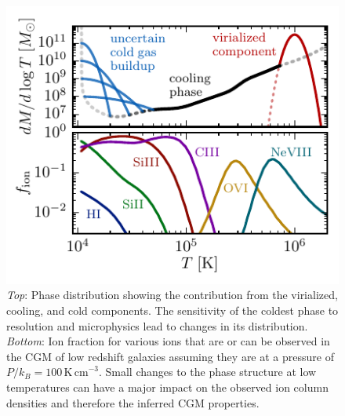 \documentclass[11pt,letterpaper,english]{article}
\begin{document}
\begin{figure}[t]
    \centering
    \begin{minipage}{0.6\textwidth}
        \includegraphics[width=\textwidth]{../figures/dMdlogT_picture_ion_all_P100_broad_narrow_3in.pdf} 
    \end{minipage}\hfill
    \begin{minipage}{0.4\textwidth}
        \centering
\caption{\textit{Top}: Phase distribution showing the contribution from the virialized, cooling, and cold components. The sensitivity of the coldest phase to resolution and microphysics lead to changes in its distribution. \textit{Bottom}: Ion fraction for various ions that are or can be observed in the CGM of low redshift galaxies assuming they are at a pressure of $P/k_B = 100\,\mathrm{K\,cm}^{-3}$. Small changes to the phase structure at low temperatures can have a major impact on the observed ion column densities and therefore the inferred CGM properties.\label{fig:multiphase}} 
\end{minipage}
\end{figure}

\end{document}
